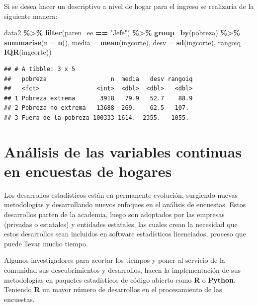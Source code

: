 \documentclass[
  spanish,
  12pt,
]{book}
\newenvironment{Shaded}{\begin{snugshade}}{\end{snugshade}}
\newcommand{\AttributeTok}[1]{\textcolor[rgb]{0.13,0.29,0.53}{#1}}
\newcommand{\FunctionTok}[1]{\textcolor[rgb]{0.13,0.29,0.53}{\textbf{#1}}}
\newcommand{\NormalTok}[1]{#1}
\newcommand{\SpecialCharTok}[1]{\textcolor[rgb]{0.81,0.36,0.00}{\textbf{#1}}}
\newcommand{\StringTok}[1]{\textcolor[rgb]{0.31,0.60,0.02}{#1}}
\begin{document}
Si se desea hacer un descriptivo a nivel de hogar para el ingreso se realizaría de la siguiente manera:

\begin{Shaded}
\begin{Highlighting}[]
\NormalTok{data2 }\SpecialCharTok{\%\textgreater{}\%} \FunctionTok{filter}\NormalTok{(paren\_ee }\SpecialCharTok{==} \StringTok{"Jefe"}\NormalTok{) }\SpecialCharTok{\%\textgreater{}\%} 
  \FunctionTok{group\_by}\NormalTok{(pobreza) }\SpecialCharTok{\%\textgreater{}\%}
  \FunctionTok{summarise}\NormalTok{(}\AttributeTok{n =} \FunctionTok{n}\NormalTok{(),}
            \AttributeTok{media =} \FunctionTok{mean}\NormalTok{(ingcorte),}
            \AttributeTok{desv =} \FunctionTok{sd}\NormalTok{(ingcorte),}
            \AttributeTok{rangoiq =} \FunctionTok{IQR}\NormalTok{(ingcorte))}
\end{Highlighting}
\end{Shaded}

\begin{verbatim}
## # A tibble: 3 x 5
##   pobreza                  n  media   desv rangoiq
##   <fct>                <int>  <dbl>  <dbl>   <dbl>
## 1 Pobreza extrema       3918   79.9   52.7    88.9
## 2 Pobreza no extrema   13688  269.    62.5   107. 
## 3 Fuera de la pobreza 100333 1614.  2355.   1055.
\end{verbatim}

\chapter{Análisis de las variables continuas en encuestas de hogares}\label{anuxe1lisis-de-las-variables-continuas-en-encuestas-de-hogares}

Los desarrollos estadísticos están en permanente evolución, surgiendo nuevas metodologías y desarrollando nuevos enfoques en el análisis de encuestas. Estos desarrollos parten de la academia, luego son adoptados por las empresas (privadas o estatales) y entidades estatales, las cuales crean la necesidad que estos desarrollos sean incluidos en software estadísticos licenciados, proceso que puede llevar mucho tiempo.

Algunos investigadores para acortar los tiempos y poner al servicio de la comunidad sus descubrimientos y desarrollos, hacen la implementación de sus metodologías en paquetes estadísticos de código abierto como \textbf{R} o \textbf{Python}. Teniendo \textbf{R} un mayor número de desarrollos en el procesamiento de las encuestas.
\end{document}
